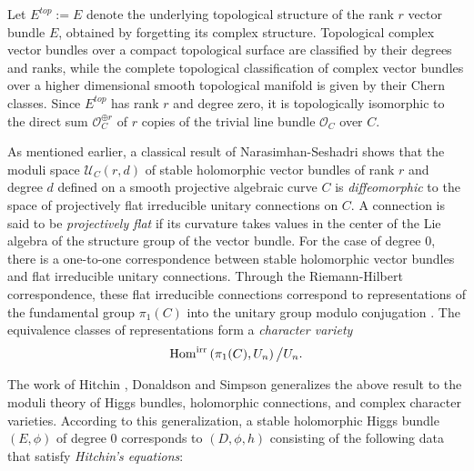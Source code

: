 \documentclass[oneside, 11pt]{amsart}
\theoremstyle{definition}
\numberwithin{equation}{subsection}
\def\Hom{{\text{\rm{Hom}}}}
\def\dsum{\oplus}
\newcommand{\cO}{{\mathcal{O}}}
\newcommand{\cU}{{\mathcal{U}}}
\begin{document}
Let $E^{top}:=E$ denote the underlying topological structure of the rank $r$ vector bundle $E$, obtained by forgetting its complex structure. Topological complex vector bundles over a compact topological surface are classified by their degrees and ranks, while the complete topological classification of complex vector bundles over a higher dimensional smooth topological manifold is given by their Chern classes. Since $E^{top}$ has rank $r$ and degree zero, it is topologically isomorphic to the direct sum $\mathcal{O}_{C}^{\dsum r}$ of $r$ copies of the trivial line bundle  $\cO_C$ over $C$.


As mentioned earlier, 
a classical result of Narasimhan-Seshadri \cite{NS}
shows that the moduli space $\cU_C(r,d)$ of stable 
holomorphic vector bundles of rank $r$ and
degree $d$ defined on 
a smooth projective algebraic curve $C$ is 
\emph{diffeomorphic} to the space of 
 projectively flat irreducible unitary  
connections
on $C$. A connection is said to be
\emph{projectively flat} if its curvature
takes values in the center of the Lie algebra of 
the structure group of the vector bundle.
For the case of degree $0$, 
there is a one-to-one correspondence
between stable holomorphic vector bundles
and  flat irreducible unitary connections. Through the Riemann-Hilbert
correspondence, these flat irreducible connections 
correspond to representations of 
the fundamental group $\pi_1(C)$ into
the unitary group modulo conjugation
\cite{AB,MFK}. The 
 equivalence classes of representations 
form a \emph{character variety}
$$\Hom^{\text{irr}}\left(\pi_1(C),U_n\right)\big/
U_n.
$$




The work of Hitchin \cite{H1}, Donaldson \cite{D}
and Simpson \cite{S} generalizes the above result
to the moduli theory of Higgs bundles, holomorphic 
connections, and complex character varieties. 
According to this 
generalization, a stable holomorphic Higgs bundle $(E, \phi)$ of degree $0$
corresponds to  $(D, \phi, h)$ consisting of the following data that satisfy \emph{Hitchin's equations}:
\end{document}
